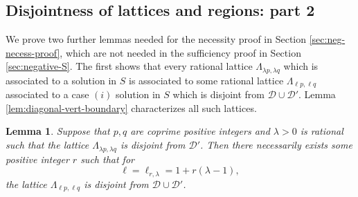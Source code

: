 \documentclass[11pt, letterpaper, reqno]{amsart}
\newtheorem{lem}[thm]{Lemma}
\theoremstyle{definition}
\theoremstyle{remark}
\numberwithin{equation}{section}
\newcommand{\cD}{\mathcal{D}}
\newcommand{\cDprime}{{\mathcal{D}'}}
\begin{document}
%
%
\subsection{Disjointness of lattices and regions: part 2}
\label{sec:disjoint2}

 We prove two  further lemmas  needed  for the necessity proof in Section \ref{sec:neg-necess-proof}, 
 which are not needed in the sufficiency proof in Section \ref{sec:negative-S}.
 The first  shows that every rational lattice $\Lambda_{\lambda p, \lambda q}$
 which is associated to a solution in $S$ 
 is associated  to some rational lattice $\Lambda_{\ell p, \ell q}$
 associated to a case $(i)$ solution in $S$ which is disjoint from $\cD \cup \cDprime$.
  Lemma \ref{lem:diagonal-vert-boundary} characterizes all such lattices.



\begin{lem}
\label{lem:neg-sporadic-converse}
Suppose that $p,q$ are coprime positive integers and $\lambda > 0$ is rational such that the lattice
$\Lambda_{\lambda p,\lambda q} $
is disjoint from $\cDprime$. 
Then there necessarily exists some positive integer $r$ such that for 
\[ 
\ell = \ell_{r,\lambda} =   1 + r(\lambda - 1),
\]
the lattice $\Lambda_{\ell p, \ell q}$ is disjoint from $\cD \cup \cDprime$.
\end{lem}
\end{document}
